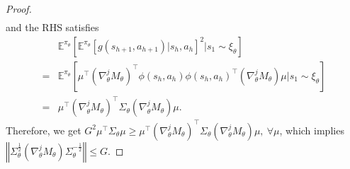 \documentclass{article}
\numberwithin{equation}{section}
\begin{document}
\begin{proof}
\begin{align*}
\end{align*}
and the RHS satisfies 
\begin{align*}
    &\mathbb{E}^{\pi_\theta}[\mathbb{E}^{\pi_\theta}[g(s_{h+1},a_{h+1})\vert s_h, a_h]^2\vert s_1\sim\xi_\theta]\\
    =&\mathbb{E}^{\pi_\theta}[\mu^\top\left(\nabla_\theta^j M_\theta\right)^\top\phi(s_h,a_h)\phi(s_h,a_h)^\top\left(\nabla_\theta^j M_\theta\right)\mu\vert s_1\sim\xi_\theta]\\
    =&\mu^\top\left(\nabla_\theta^j M_\theta\right)^\top\Sigma_\theta\left(\nabla_\theta^j M_\theta\right)\mu.
\end{align*}
Therefore, we get $G^2\mu^\top\Sigma_\theta\mu\geq\mu^\top\left(\nabla_\theta^j M_\theta\right)^\top\Sigma_\theta\left(\nabla_\theta^j M_\theta\right)\mu,\ \forall\mu$, which implies $\left\Vert\Sigma_\theta^{\frac{1}{2}}\left(\nabla_\theta^j M_\theta\right)\Sigma_\theta^{-\frac{1}{2}}\right\Vert\leq G$.
\end{proof}
\end{document}
